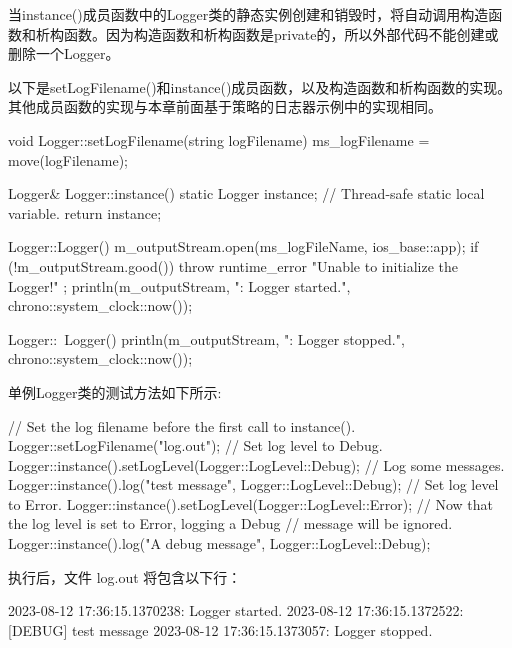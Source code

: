 当instance()成员函数中的Logger类的静态实例创建和销毁时，将自动调用构造函数和析构函数。因为构造函数和析构函数是private的，所以外部代码不能创建或删除一个Logger。

以下是setLogFilename()和instance()成员函数，以及构造函数和析构函数的实现。其他成员函数的实现与本章前面基于策略的日志器示例中的实现相同。

\begin{cpp}
void Logger::setLogFilename(string logFilename)
{ ms_logFilename = move(logFilename); }

Logger& Logger::instance()
{
    static Logger instance; // Thread-safe static local variable.
    return instance;
}

Logger::Logger()
{
    m_outputStream.open(ms_logFileName, ios_base::app);
    if (!m_outputStream.good()) {
        throw runtime_error { "Unable to initialize the Logger!" };
    }
    println(m_outputStream, "{}: Logger started.", chrono::system_clock::now());
}


Logger::~Logger()
{ println(m_outputStream, "{}: Logger stopped.", chrono::system_clock::now()); }
\end{cpp}


单例Logger类的测试方法如下所示:

\begin{cpp}
// Set the log filename before the first call to instance().
Logger::setLogFilename("log.out");
// Set log level to Debug.
Logger::instance().setLogLevel(Logger::LogLevel::Debug);
// Log some messages.
Logger::instance().log("test message", Logger::LogLevel::Debug);
// Set log level to Error.
Logger::instance().setLogLevel(Logger::LogLevel::Error);
// Now that the log level is set to Error, logging a Debug
// message will be ignored.
Logger::instance().log("A debug message", Logger::LogLevel::Debug);
\end{cpp}

执行后，文件 log.out 将包含以下行：

\begin{shell}
2023-08-12 17:36:15.1370238: Logger started.
2023-08-12 17:36:15.1372522: [DEBUG] test message
2023-08-12 17:36:15.1373057: Logger stopped.
\end{shell}





















